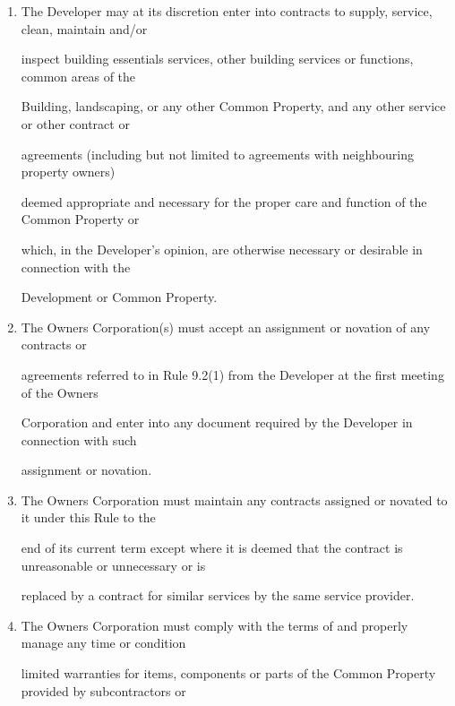 \documentclass{article}
\begin{document}
\begin{enumerate}[label=\arabic*.]
\begin{enumerate}[label=\arabic{enumi}.\arabic*.]
\begin{enumerate}[label=(\arabic*)]
\item {\fontsize{9.962}{1} The Developer may at its discretion enter into contracts to supply, service, clean, maintain and/or }

{\fontsize{10.02}{1}inspect building essentials services, other building services or functions, common areas of the }

{\fontsize{10.02}{1}Building, landscaping, or any other Common Property, and any other service or other contract or }

{\fontsize{10.02}{1}agreements (including but not limited to agreements with neighbouring property owners) }

{\fontsize{10.02}{1}deemed appropriate and necessary for the proper care and function of the Common Property or }

{\fontsize{10.02}{1}which, in the Developer’s opinion, are otherwise necessary or desirable in connection with the }

{\fontsize{10.02}{1}Development or Common Property. }

\item {\fontsize{9.962}{1} The Owners Corporation(s) must accept an assignment or novation of any contracts or }

{\fontsize{10.02}{1}agreements referred to in Rule 9.2(1) from the Developer at the first meeting of the Owners }

\newpage

{\fontsize{10.02}{1}Corporation and enter into any document required by the Developer in connection with such }

{\fontsize{10.02}{1}assignment or novation. }

\item {\fontsize{9.962}{1} The Owners Corporation must maintain any contracts assigned or novated to it under this Rule to the }

{\fontsize{10.02}{1}end of its current term except where it is deemed that the contract is unreasonable or unnecessary or is }

{\fontsize{10.02}{1}replaced by a contract for similar services by the same service provider. }

\item {\fontsize{9.962}{1} The Owners Corporation must comply with the terms of and properly manage any time or condition }

{\fontsize{10.02}{1}limited warranties for items, components or parts of the Common Property provided by subcontractors or }


\end{enumerate}
\end{enumerate}
\end{enumerate}
\end{document}
